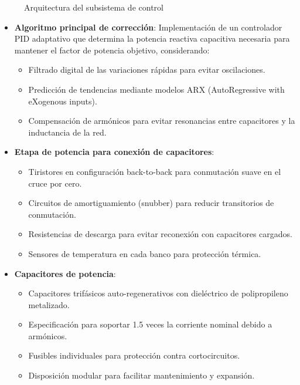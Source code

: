 \documentclass{report}          %
\begin{document}
                \begin{figure}[H]
                    \centering
                    \caption{Arquitectura del subsistema de control}
                \end{figure}

                \begin{itemize}
                    \item \textbf{Algoritmo principal de corrección}: Implementación de un controlador PID adaptativo que determina la potencia reactiva capacitiva necesaria para mantener el factor de potencia objetivo, considerando:
                    \begin{itemize}
                        \item Filtrado digital de las variaciones rápidas para evitar oscilaciones.
                        \item Predicción de tendencias mediante modelos ARX (AutoRegressive with eXogenous inputs).
                        \item Compensación de armónicos para evitar resonancias entre capacitores y la inductancia de la red.
                    \end{itemize}
                    
                    \item \textbf{Etapa de potencia para conexión de capacitores}:
                    \begin{itemize}
                        \item Tiristores en configuración back-to-back para conmutación suave en el cruce por cero.
                        \item Circuitos de amortiguamiento (snubber) para reducir transitorios de conmutación.
                        \item Resistencias de descarga para evitar reconexión con capacitores cargados.
                        \item Sensores de temperatura en cada banco para protección térmica.
                    \end{itemize}
                    
                    \item \textbf{Capacitores de potencia}:
                    \begin{itemize}
                        \item Capacitores trifásicos auto-regenerativos con dieléctrico de polipropileno metalizado.
                        \item Especificación para soportar 1.5 veces la corriente nominal debido a armónicos.
                        \item Fusibles individuales para protección contra cortocircuitos.
                        \item Disposición modular para facilitar mantenimiento y expansión.
                    \end{itemize}
                \end{itemize}
\end{document}
